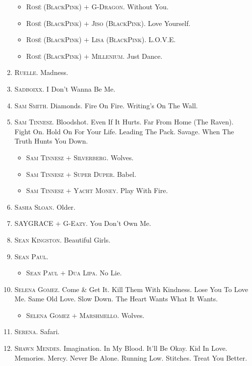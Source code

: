 \documentclass{article}
\begin{document}
\begin{enumerate}
	\begin{itemize}
		\item \textsc{Ros\'e (BlackPink) $+$ G-Dragon.} Without You.
		\item \textsc{Ros\'e (BlackPink) $+$ Jiso (BlackPink).} Love Yourself.
		\item \textsc{Ros\'e (BlackPink) $+$ Lisa (BlackPink).} L.O.V.E.
		\item \textsc{Ros\'e (BlackPink) $+$ Millenium.} Just Dance.
	\end{itemize}
	\item \textsc{Ruelle.} Madness.
	\item \textsc{Sadboixx.} I Don't Wanna Be Me.
	\item \textsc{Sam Smith.} Diamonds. Fire On Fire. Writing's On The Wall.
	\item \textsc{Sam Tinnesz.} Bloodshot. Even If It Hurts. Far From Home (The Raven). Fight On. Hold On For Your Life. Leading The Pack. Savage. When The Truth Hunts You Down.
	\begin{itemize}
		\item \textsc{Sam Tinnesz $+$ Silverberg.} Wolves.
		\item \textsc{Sam Tinnesz $+$ Super Duper.} Babel.
		\item \textsc{Sam Tinnesz $+$ Yacht Money.} Play With Fire.
	\end{itemize}
	\item \textsc{Sasha Sloan.} Older.
	\item \textsc{SAYGRACE $+$ G-Eazy.} You Don't Own Me.
	\item \textsc{Sean Kingston.} Beautiful Girls.
	\item \textsc{Sean Paul.}
	\begin{itemize}
		\item \textsc{Sean Paul $+$ Dua Lipa.} No Lie.
	\end{itemize}
	\item \textsc{Selena Gomez.} Come \& Get It. Kill Them With Kindness. Lose You To Love Me. Same Old Love. Slow Down. The Heart Wants What It Wants.
	\begin{itemize}
		\item \textsc{Selena Gomez $+$ Marshmello.} Wolves.
	\end{itemize}
	\item \textsc{Serena.} Safari.
	\item \textsc{Shawn Mendes.} Imagination. In My Blood. It'll Be Okay. Kid In Love. Memories. Mercy. Never Be Alone. Running Low. Stitches. Treat You Better.

\end{enumerate}
\end{document}

